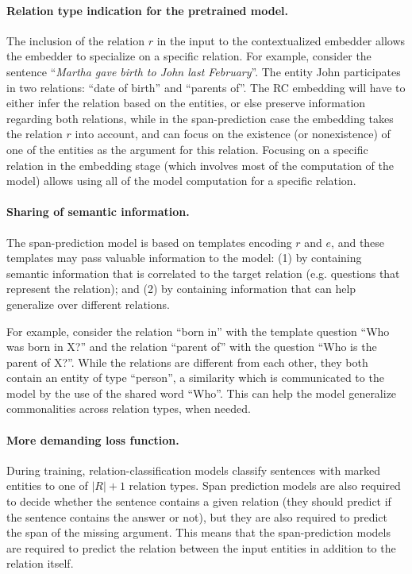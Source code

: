 \documentclass[11pt]{article}
\begin{document}
\paragraph{Relation type indication for the pretrained model.}
The inclusion of the relation $r$ in the input to the contextualized embedder allows the embedder to specialize on a specific relation. For example, consider the sentence ``\emph{Martha gave birth to John last February}''. The entity John participates in two relations: ``date of birth'' and ``parents of''. The RC embedding will have to either infer the relation based on the entities, or else preserve information regarding both relations, while in the span-prediction case the embedding takes the relation $r$ into account, and can focus on the existence (or nonexistence) of one of the entities as the argument for this relation. Focusing on a specific relation in the embedding stage (which involves most of the computation of the model) allows using all of the model computation for a specific relation.

\paragraph{Sharing of semantic information.}
The span-prediction model is based on templates encoding $r$ and $e$, and these templates may pass valuable information to the model:
(1) by containing semantic information that is correlated to the target relation (e.g. questions that represent the relation); and
(2) by containing information that can help generalize over different relations.

For example, consider the relation ``born in'' with the template question ``Who was born in X?'' and the relation ``parent of'' with the question ``Who is the parent of X?''. While the relations are different from each other, they both contain an entity of type ``person'', a similarity which is communicated to the model by the use of the shared word ``Who''. This can help the model generalize commonalities across relation types, when needed.

\paragraph{More demanding loss function.}
During training, relation-classification models classify sentences with marked entities to one of $|R| + 1$ relation types. Span prediction models are also required to decide whether the sentence contains a given relation (they should predict if the sentence contains the answer or not), but they are also required to predict the span of the missing argument. This means that the span-prediction models are required to predict the relation between the input entities in addition to the relation itself.
\end{document}
